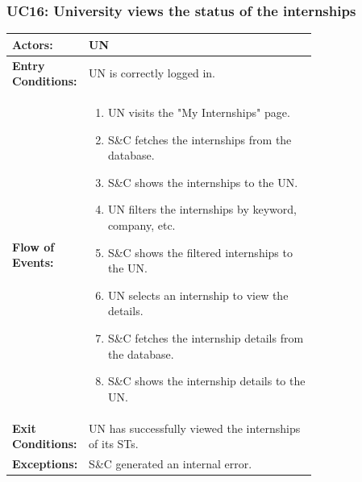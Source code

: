 
\subsubsection{UC16: University views the status of the internships}
\label{subsubsec:university-views-the-status-of-the-internships}

\begin{center}
    \begin{longtable}{|l|p{0.75\linewidth}|}
        \hline
        \textbf{Actors:}           & UN                                                          \\
        \hline
        \textbf{Entry Conditions:} & UN is correctly logged in.                                  \\
        \hline
        \textbf{Flow of Events:}   & \begin{enumerate}
                                         \item UN visits the "My Internships" page.
                                         \item S\&C fetches the internships from the database.
                                         \item S\&C shows the internships to the UN.
                                         \item UN filters the internships by keyword, company, etc.
                                         \item S\&C shows the filtered internships to the UN.
                                         \item UN selects an internship to view the details.
                                         \item S\&C fetches the internship details from the database.
                                         \item S\&C shows the internship details to the UN.
                                     \end{enumerate} \\
        \hline
        \textbf{Exit Conditions:}  & UN has successfully viewed the internships of its STs.      \\
        \hline
        \textbf{Exceptions:}       & S\&C generated an internal error.                           \\
        \hline
    \end{longtable}
\end{center}

